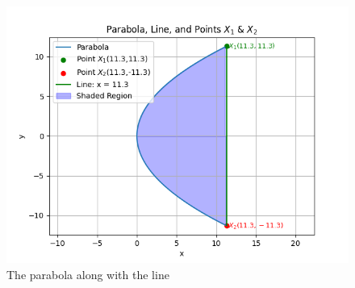 \documentclass[journal]{IEEEtran}
\begin{document}
\begin{figure}[h!]
   \centering
   \includegraphics[width = 1\linewidth]{figs/fig.png}
   \caption{The parabola along with the line}
   \label{stemplot}
\end{figure}
\end{document}
